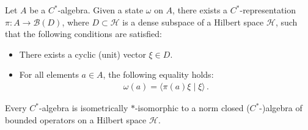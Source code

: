     \begin{construct}\label{operators:gns}
        Let $A$ be a $C^*$-algebra. Given a state $\omega$ on $A$, there exists a $C^*$-representation $\pi:A\rightarrow\mathcal{B}(D)$, where $D\subset\mathcal{H}$ is a dense subspace of a Hilbert space $\mathcal{H}$, such that the following conditions are satisfied:
        \begin{itemize}
            \item There exists a cyclic (unit) vector $\xi\in D$.
            \item For all elements $a\in A$, the following equality holds:
                \begin{gather}
                    \omega(a) = \langle\pi(a)\xi\mid\xi\rangle\,.
                \end{gather}
        \end{itemize}

    \end{construct}

    \begin{theorem}\label{operators:gelfand_naimark}
        Every $C^*$-algebra is isometrically $\ast$-isomorphic to a norm closed ($C^*$-)algebra of bounded operators on a Hilbert space $\mathcal{H}$.
    \end{theorem}

\subsection{}


